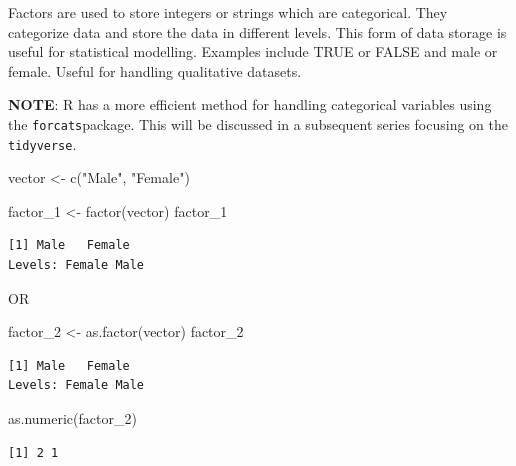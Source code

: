 \documentclass[
  letterpaper,
  DIV=11,
  numbers=noendperiod]{scrreprt}
\newenvironment{Shaded}{\begin{snugshade}}{\end{snugshade}}
\newcommand{\FunctionTok}[1]{\textcolor[rgb]{0.28,0.35,0.67}{#1}}
\newcommand{\NormalTok}[1]{\textcolor[rgb]{0.00,0.23,0.31}{#1}}
\newcommand{\OtherTok}[1]{\textcolor[rgb]{0.00,0.23,0.31}{#1}}
\newcommand{\StringTok}[1]{\textcolor[rgb]{0.13,0.47,0.30}{#1}}
\begin{document}
Factors are used to store integers or strings which are categorical.
They categorize data and store the data in different levels. This form
of data storage is useful for statistical modelling. Examples include
TRUE or FALSE and male or female. Useful for handling qualitative
datasets.

\textbf{NOTE}: R has a more efficient method for handling categorical
variables using the \texttt{forcats}package. This will be discussed in a
subsequent series focusing on the \texttt{tidyverse}.

\begin{Shaded}
\begin{Highlighting}[]
\NormalTok{vector }\OtherTok{\textless{}{-}} \FunctionTok{c}\NormalTok{(}\StringTok{"Male"}\NormalTok{, }\StringTok{"Female"}\NormalTok{)}
\end{Highlighting}
\end{Shaded}

\begin{Shaded}
\begin{Highlighting}[]
\NormalTok{factor\_1 }\OtherTok{\textless{}{-}} \FunctionTok{factor}\NormalTok{(vector) }
\NormalTok{factor\_1}
\end{Highlighting}
\end{Shaded}

\begin{verbatim}
[1] Male   Female
Levels: Female Male
\end{verbatim}

OR

\begin{Shaded}
\begin{Highlighting}[]
\NormalTok{factor\_2 }\OtherTok{\textless{}{-}} \FunctionTok{as.factor}\NormalTok{(vector) }
\NormalTok{factor\_2}
\end{Highlighting}
\end{Shaded}

\begin{verbatim}
[1] Male   Female
Levels: Female Male
\end{verbatim}

\begin{Shaded}
\begin{Highlighting}[]
\FunctionTok{as.numeric}\NormalTok{(factor\_2)}
\end{Highlighting}
\end{Shaded}

\begin{verbatim}
[1] 2 1
\end{verbatim}
\end{document}
